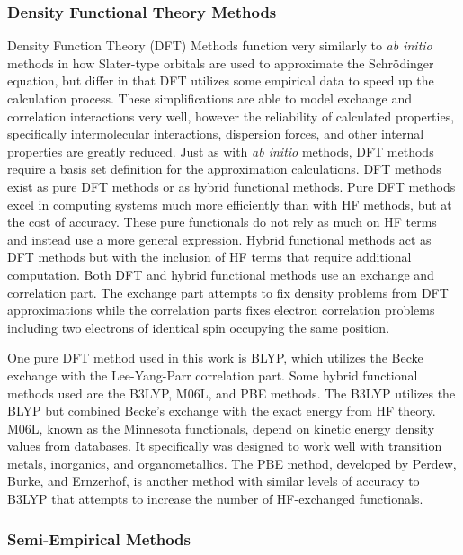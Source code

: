 \subsubsection{Density Functional Theory Methods}

Density Function Theory (DFT) Methods function very similarly to \textit{ab initio} methods in how Slater-type orbitals are used to approximate the Schr\"{o}dinger equation, but differ in that DFT utilizes some empirical data to speed up the calculation process.\cite{DFT}
These simplifications are able to model exchange and correlation interactions very well, however the reliability of calculated properties, specifically intermolecular interactions, dispersion forces, and other internal properties are greatly reduced.
Just as with \textit{ab initio} methods, DFT methods require a basis set definition for the approximation calculations.
DFT methods exist as pure DFT methods or as hybrid functional methods.
Pure DFT methods excel in computing systems much more efficiently than with HF methods, but at the cost of accuracy.
These pure functionals do not rely as much on HF terms and instead use a more general expression.
Hybrid functional methods act as DFT methods but with the inclusion of HF terms that require additional computation.
Both DFT and hybrid functional methods use an exchange and correlation part.\cite{KohnExchangeCorrelation}
The exchange part attempts to fix density problems from DFT approximations while the correlation parts fixes electron correlation problems including two electrons of identical spin occupying the same position.


One pure DFT method used in this work is BLYP, which utilizes  the Becke exchange with the Lee-Yang-Parr correlation part.
Some hybrid functional methods used are the B3LYP, M06L, and PBE methods.
The B3LYP utilizes the BLYP but combined Becke's exchange with the exact energy from HF theory.
M06L, known as the Minnesota functionals, depend on kinetic energy density values from databases.
It specifically was designed to work well with transition metals, inorganics, and organometallics.\cite{M06L}
The PBE method, developed by Perdew, Burke, and Ernzerhof,  is another method with similar levels of accuracy to B3LYP that attempts to increase the number of HF-exchanged functionals.\cite{PBE}

\subsubsection{Semi-Empirical Methods}

